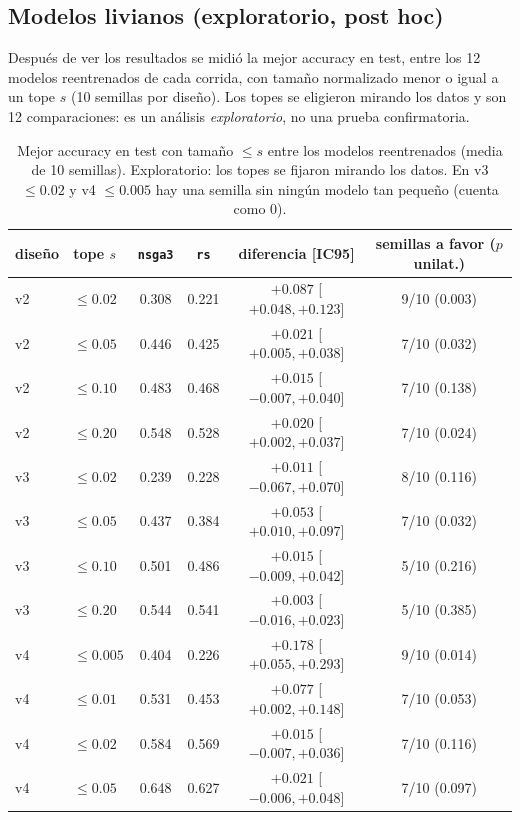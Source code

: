 \documentclass[11pt,a4paper]{article}
\begin{document}
\subsection*{Modelos livianos (exploratorio, post hoc)}
Después de ver los resultados se midió la mejor accuracy en test, entre los 12 modelos reentrenados de cada corrida, con tamaño normalizado menor o igual a un tope $s$ (10 semillas por diseño). Los topes se eligieron mirando los datos y son 12 comparaciones: es un análisis \emph{exploratorio}, no una prueba confirmatoria.
\begin{table}[h]
\centering\footnotesize
\begin{tabular}{llcccc}
\toprule
diseño & tope $s$ & \texttt{nsga3} & \texttt{rs} & diferencia [IC95] & semillas a favor ($p$ unilat.)\\
\midrule
v2 & $\le 0.02$ & 0.308 & 0.221 & $+0.087$ [$+0.048,+0.123$] & 9/10 (0.003)\\
v2 & $\le 0.05$ & 0.446 & 0.425 & $+0.021$ [$+0.005,+0.038$] & 7/10 (0.032)\\
v2 & $\le 0.10$ & 0.483 & 0.468 & $+0.015$ [$-0.007,+0.040$] & 7/10 (0.138)\\
v2 & $\le 0.20$ & 0.548 & 0.528 & $+0.020$ [$+0.002,+0.037$] & 7/10 (0.024)\\
v3 & $\le 0.02$ & 0.239 & 0.228 & $+0.011$ [$-0.067,+0.070$] & 8/10 (0.116)\\
v3 & $\le 0.05$ & 0.437 & 0.384 & $+0.053$ [$+0.010,+0.097$] & 7/10 (0.032)\\
v3 & $\le 0.10$ & 0.501 & 0.486 & $+0.015$ [$-0.009,+0.042$] & 5/10 (0.216)\\
v3 & $\le 0.20$ & 0.544 & 0.541 & $+0.003$ [$-0.016,+0.023$] & 5/10 (0.385)\\
v4 & $\le 0.005$ & 0.404 & 0.226 & $+0.178$ [$+0.055,+0.293$] & 9/10 (0.014)\\
v4 & $\le 0.01$ & 0.531 & 0.453 & $+0.077$ [$+0.002,+0.148$] & 7/10 (0.053)\\
v4 & $\le 0.02$ & 0.584 & 0.569 & $+0.015$ [$-0.007,+0.036$] & 7/10 (0.116)\\
v4 & $\le 0.05$ & 0.648 & 0.627 & $+0.021$ [$-0.006,+0.048$] & 7/10 (0.097)\\
\bottomrule
\end{tabular}
\caption{Mejor accuracy en test con tamaño $\le s$ entre los modelos reentrenados (media de 10 semillas). Exploratorio: los topes se fijaron mirando los datos. En v3 $\le 0.02$ y v4 $\le 0.005$ hay una semilla sin ningún modelo tan pequeño (cuenta como 0).}
\label{tab:livianos}
\end{table}
\end{document}
